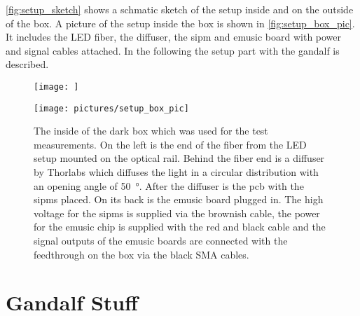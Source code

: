 \autoref{fig:setup_sketch} shows a schmatic sketch of the setup inside and on the outside of the box.
A picture of the setup inside the box is shown in \autoref{fig:setup_box_pic}.
It includes the LED fiber, the diffuser, the \ac{sipm} and \ac{emusic} board with power and signal cables attached.
In the following the setup part with the \ac{gandalf} is described.
\begin{figure}
	\centering
	\texttt{[image: ]}
	\caption[]{}
	\label{fig:setup_sketch}
\end{figure}
\begin{figure}
	\centering
	\texttt{[image: pictures/setup\_box\_pic]}
	\caption[Picture of the inside of the dark box.]{The inside of the dark box which was used for the test measurements. On the left is the end of the fiber from the LED setup mounted on the optical rail. Behind the fiber end is a diffuser by Thorlabs which diffuses the light in a circular distribution with an opening angle of \SI{50}{\degree}. After the diffuser is the \ac{pcb} with the \acp{sipm} placed. On its back is the \ac{emusic} board plugged in. The high voltage for the \acp{sipm} is supplied via the brownish cable, the power for the \ac{emusic} chip is supplied with the red and black cable and the signal outputs of the \ac{emusic} boards are connected with the feedthrough on the box via the black SMA cables.}
	\label{fig:setup_box_pic}
\end{figure}

\section{Gandalf Stuff}

